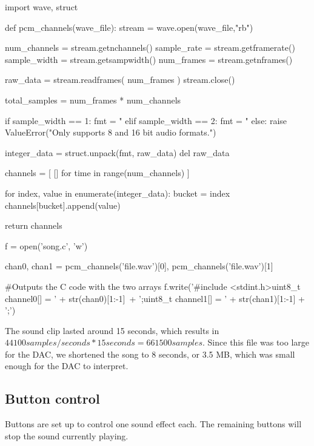 \begin{code}
import wave, struct

def pcm_channels(wave_file):
    stream = wave.open(wave_file,"rb")

    num_channels = stream.getnchannels()
    sample_rate = stream.getframerate()
    sample_width = stream.getsampwidth()
    num_frames = stream.getnframes()

    raw_data = stream.readframes( num_frames )
    stream.close()

    total_samples = num_frames * num_channels

    if sample_width == 1: 
        fmt = "%
    elif sample_width == 2:
        fmt = "%
    else:
        raise ValueError("Only supports 8 and 16 bit audio formats.")

    integer_data = struct.unpack(fmt, raw_data)
    del raw_data

    channels = [ [] for time in range(num_channels) ]

    for index, value in enumerate(integer_data):
        bucket = index %
        channels[bucket].append(value)

    return channels

f = open('song.c', 'w')

chan0, chan1 = pcm_channels('file.wav')[0], pcm_channels('file.wav')[1]

#Outputs the C code with the two arrays
f.write('#include <stdint.h>\n\nconst uint8_t channel0[] = {' + str(chan0)[1:-1]\
 + '};\n\nconst uint8_t channel1[] = {' + str(chan1)[1:-1] + '};')

\end{code}

\newpage

The sound clip lasted around 15 seconds, which results in $44100 samples/seconds * 15 seconds = 661500 samples$. 
Since this file was too large for the DAC, we shortened the song to 8 seconds, or 3.5 MB, which was small enough for the DAC to interpret.


\subsection{Button control}

Buttons are set up to control one sound effect each. The remaining buttons will stop the sound currently playing.
